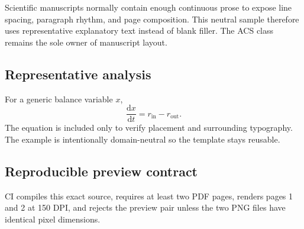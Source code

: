 \documentclass[journal=esthag,manuscript=article]{achemso}
\begin{document}
Scientific manuscripts normally contain enough continuous prose to expose line spacing, paragraph rhythm, and page composition. This neutral sample therefore uses representative explanatory text instead of blank filler. The ACS class remains the sole owner of manuscript layout.

\subsection{Representative analysis}
For a generic balance variable $x$,
\begin{equation}
  \frac{\mathrm{d}x}{\mathrm{d}t}=r_{\mathrm{in}}-r_{\mathrm{out}}.
\end{equation}
The equation is included only to verify placement and surrounding typography. The example is intentionally domain-neutral so the template stays reusable.

\subsection{Reproducible preview contract}
CI compiles this exact source, requires at least two PDF pages, renders pages 1 and 2 at 150 DPI, and rejects the preview pair unless the two PNG files have identical pixel dimensions.


\end{document}

